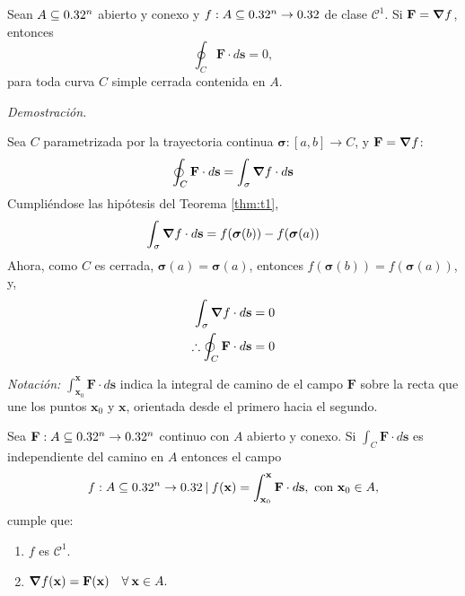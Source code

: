 \begin{corollary}\label{tmh:c3}
    Sean $A\subseteq0.32^n$ abierto y conexo y $f:A\subseteq0.32^n\to0.32$ de clase $\mathcal{C}^1$. Si $\mathbf{F}=\grad f$, entonces
    $$\oint_C\mathbf{F}\cdot d\mathbf{s}=0,$$
    para toda curva $C$ simple cerrada contenida en $A$.

    \textit{Demostración.} 
    
    Sea $C$ parametrizada por la trayectoria continua $\boldsymbol{\sigma}:[a,b]\to C$, y $\mathbf{F}=\grad f$:
    \begin{equation*}
        \oint_C\mathbf{F}\cdot d\mathbf{s}=\int_{\sigma}\grad f\cdot d\mathbf{s}
    \end{equation*}
    Cumpliéndose las hipótesis del Teorema \ref{thm:t1},
    \begin{equation*}
        \int_{\sigma}\grad f\cdot d\mathbf{s}=f(\boldsymbol{\sigma}(b))-f(\boldsymbol{\sigma}(a))
    \end{equation*}
    Ahora, como $C$ es cerrada, $\boldsymbol{\sigma}(a)=\boldsymbol{\sigma}(a)$, entonces $f(\boldsymbol{\sigma}(b))=f(\boldsymbol{\sigma}(a))$, y,
    \begin{align*}
        \int_{\sigma}\grad f\cdot d\mathbf{s}&=0\\
         \therefore \oint_C\mathbf{F}\cdot d\mathbf{s}&=0
    \end{align*}

\end{corollary}

\textit{Notación:} $\int_{\mathbf{x}_0}^{\mathbf{x}}\mathbf{F}\cdot d\mathbf{s}$ indica la integral de camino de el campo $\mathbf{F}$ sobre la recta que une los puntos $\mathbf{x}_0$
    y $\mathbf{x}$, orientada desde el primero hacia el segundo.

\begin{theorem}\label{tmh:t2}
   Sea  $\mathbf{F}:A\subseteq0.32^n \to 0.32^n$ continuo con  $A$ abierto y conexo. Si  $\int_C \mathbf{F}\cdot d\mathbf{s}$ es independiente del camino en $A$  entonces el campo
    $$f:A\subseteq0.32^n\to0.32\: | \:f(\mathbf{x})=\int_{\mathbf{x}_0}^{\mathbf{x}}\mathbf{F}\cdot d\mathbf{s},  \mbox{ con }  \mathbf{x}_0\in A, $$
    cumple que: 
    \begin{enumerate}
        \item $f$ es $\mathcal{C}^1$.
        \item $\grad f(\mathbf{x})=\mathbf{F}(\mathbf{x})\quad\forall\:\mathbf{x}\in A.$
    \end{enumerate}
\end{theorem}

